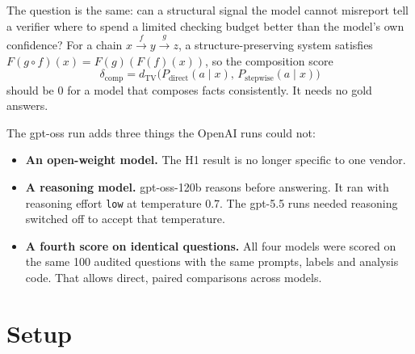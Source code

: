 \documentclass[11pt]{article}
\newcommand{\code}[1]{\texttt{#1}}
\begin{document}
The question is the same: can a structural signal the model cannot misreport tell a
verifier where to spend a limited checking budget better than the model's own confidence?
For a chain $x \xrightarrow{f} y \xrightarrow{g} z$, a structure-preserving system
satisfies $F(g \circ f)(x) = F(g)(F(f)(x))$, so the composition score
\begin{equation}
  \delta_{\text{comp}} = d_{\mathrm{TV}}\bigl(P_{\text{direct}}(a \mid x),\, P_{\text{stepwise}}(a \mid x)\bigr)
\end{equation}
should be 0 for a model that composes facts consistently. It needs no gold answers.

The gpt-oss run adds three things the OpenAI runs could not:
\begin{itemize}
  \item \textbf{An open-weight model.} The H1 result is no longer specific to one vendor.
  \item \textbf{A reasoning model.} gpt-oss-120b reasons before answering. It ran with
        reasoning effort \code{low} at temperature 0.7. The gpt-5.5 runs needed reasoning
        switched off to accept that temperature.
  \item \textbf{A fourth score on identical questions.} All four models were scored on the
        same 100 audited questions with the same prompts, labels and analysis code. That
        allows direct, paired comparisons across models.
\end{itemize}

\section{Setup}
\end{document}
